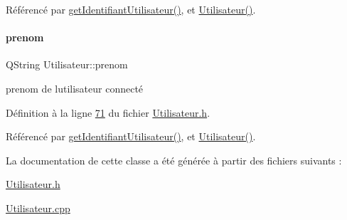 Référencé par \hyperlink{_utilisateur_8cpp_source_l00078}{get\+Identifiant\+Utilisateur()}, et \hyperlink{_utilisateur_8cpp_source_l00022}{Utilisateur()}.

\mbox{\label{class_utilisateur_a1dd0779807b19298f30f39d9c371170f}} 
\paragraph{\texorpdfstring{prenom}{prenom}}
{\footnotesize\ttfamily Q\+String Utilisateur\+::prenom\hspace{0.3cm}{\ttfamily [private]}}



prenom de l\textquotesingle{}utilisateur connecté 



Définition à la ligne \hyperlink{_utilisateur_8h_source_l00071}{71} du fichier \hyperlink{_utilisateur_8h_source}{Utilisateur.\+h}.



Référencé par \hyperlink{_utilisateur_8cpp_source_l00078}{get\+Identifiant\+Utilisateur()}, et \hyperlink{_utilisateur_8cpp_source_l00022}{Utilisateur()}.



La documentation de cette classe a été générée à partir des fichiers suivants \+:\begin{DoxyCompactItemize}
\item 
\hyperlink{_utilisateur_8h}{Utilisateur.\+h}\item 
\hyperlink{_utilisateur_8cpp}{Utilisateur.\+cpp}\end{DoxyCompactItemize}
